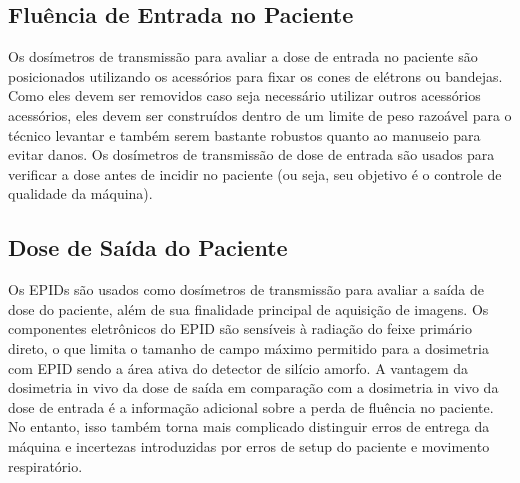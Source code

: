 \documentclass[11pt,a4paper]{article}
\begin{document}
\subsection{Fluência de Entrada no Paciente}

	Os dosímetros de transmissão para avaliar a dose de entrada no paciente são posicionados utilizando os acessórios para fixar os cones de elétrons ou bandejas. Como eles devem ser removidos caso seja necessário utilizar outros acessórios acessórios, eles devem ser construídos dentro de um limite de peso razoável para o técnico levantar e também serem bastante robustos quanto ao manuseio para evitar danos. Os dosímetros de transmissão de dose de entrada são usados para verificar a dose antes de incidir no paciente (ou seja, seu objetivo é o controle de qualidade da máquina).

\subsection{Dose de Saída do Paciente}

	Os EPIDs são usados como dosímetros de transmissão para avaliar a saída de dose do paciente, além de sua finalidade principal de aquisição de imagens. Os componentes eletrônicos do EPID são sensíveis à radiação do feixe primário direto, o que limita o tamanho de campo máximo permitido para a dosimetria com EPID sendo a área ativa do detector de silício amorfo. A vantagem da dosimetria in vivo da dose de saída em comparação com a dosimetria in vivo da dose de entrada é a informação adicional sobre a perda de fluência no paciente. No entanto, isso também torna mais complicado distinguir erros de entrega da máquina e incertezas introduzidas por erros de setup do paciente e movimento respiratório.



\end{document}
